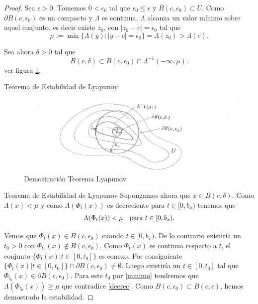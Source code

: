 \begin{proof}  Sea $\epsilon>0$. Tomemos $0<\epsilon_0$ tal que $\epsilon_0\leq\epsilon$ y 
$\overline{B}(c,\epsilon_0)\subset U$.  Como $\partial B(c,\epsilon_0)$ es un compacto y $\Lambda$ es continua, $\Lambda$
alcanza un valor mínimo sobre aquel conjunto, es decir existe $z_0$, con $|z_0-c|=\epsilon_0$ tal que
\begin{equation}\label{minimo}
 \mu:=\min\{\Lambda(y):|y-c|=\epsilon_0\}=\Lambda(z_0)>\Lambda(c).
\end{equation}

 Sea ahora $\delta>0$ tal que 
\[B(c,\delta)\subset B(c,\epsilon_0)\cap \Lambda^{-1}(-\infty,\mu).\]
ver figura \ref{dem_lya}.



 {Teorema de Estabilidad  de Lyapunov}
  \begin{figure}[h]
    \begin{center}
   \includegraphics[scale=0.5]{imagenes/dem_lya.jpg}
   \caption{Demostración Teorema Lyapunov}\label{dem_lya}
   \end{center}
 \end{figure}


{Teorema de Estabilidad  de Lyapunov}
  Supongamos ahora que $x\in B(c,\delta)$. Como $\Lambda(x)<\mu$ y como $\Lambda\left(\Phi_t(x)\right)$ es decreciente para 
 $t\in [0,b_x)$ tenemos que 
 \begin{equation}\label{decrec}
  \Lambda(\Phi_t(x))<\mu\quad\hbox{para } t\in [0,b_x).
 \end{equation}

 Vemos que $\Phi_t(x)\in B(c,\epsilon_0)$ cuando $t\in [0,b_x)$. De lo contrario existiría un $t_0>0$ con 
$\Phi_{t_0}(x)\notin B(c,\epsilon_0)$. Como $\Phi_t(x)$ es continua respecto a $t$, el conjunto 
$\{\Phi_t(x)|t\in[0,t_0]\}$ es conexo. Por consiguiente 
$ \{\Phi_t(x)|t\in[0,t_0]\}\cap \partial B(c,\epsilon_0)\neq\emptyset$. Luego existiría un $t\in[0,t_0]$ tal que
$\Phi_{t_0}(x)\in \partial B(c,\epsilon_0)$. Para este $t_0$ por \eqref{minimo} tendremos que 
$\Lambda(\Phi_{t_0}(x))\geq \mu$ que contradice \eqref{decrec}. Como $B(c,\epsilon_0)\subset B(c,\epsilon)$, hemos
demostrado la estabilidad. 


\end{proof}
